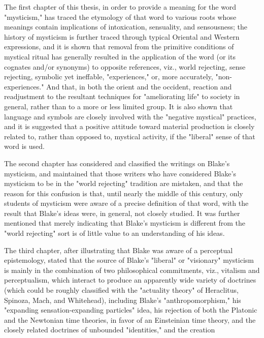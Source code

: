 The first chapter of this thesis, in order to provide a meaning for the word "mysticism," has traced the etymology
of that word to various roots whose meanings contain implications of intoxication, sensuality, and sensousness; the
history of mysticism is further traced through typical Oriental and Western expressions, and it is shown that removal
from the primitive conditions of mystical ritual has generally resulted in the application of the word (or its cognates and/or synonyms) to
opposite references, viz., world rejecting, sense rejecting, symbolic yet ineffable, "experiences," or,
more accurately, "non-experiences." And that, in both the orient and the occident, reaction and readjustment to the
resultant techniques for "ameliorating life" to society in general, rather than to a more or less
limited group. It is also shown that language and symbols are closely involved with the "negative mystical" practices,
and it is suggested that a positive attitude toward material production is closely related to, rather than opposed to,
mystical activity, if the "liberal" sense of that word is used.\par
\vspace*{0.5\baselineskip}
The second chapter has considered and classified the writings on Blake's mysticism, and maintained that those
writers who have considered Blake's mysticism to be in the "world rejecting" tradition are mistaken,
and that the reason for this confusion is that, until nearly the middle of this century, only students of mysticism were aware of a precise
definition of that word, with the result that Blake's ideas were, in general, not closely studied. It was further mentioned that
merely indicating that Blake's mysticism is different from the "world rejecting" sort is of little value to an understanding of his ideas.\par
\vspace*{0.5\baselineskip}
The third chapter, after illustrating that Blake was aware of a perceptual epistemology, stated that the source of Blake's
"liberal" or "visionary" mysticism is mainly in the combination of two philosophical commitments, viz.,
vitalism and perceptualism, which interact to produce an apparently wide variety of doctrines (which could be roughly
classified with the "actuality theory" of Heraclitus, Spinoza, Mach, and Whitehead), including Blake's "anthropomorphism,"
his "expanding sensation-expanding particles" idea, his rejection of both the Platonic and the Newtonian time theories, in favor
of an Einsteinian time theory, and the closely related doctrines of unbounded "identities," and the creation
